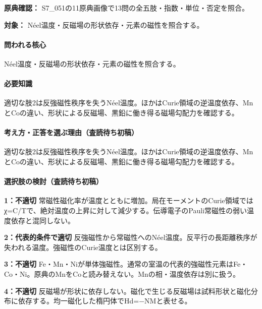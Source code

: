\noindent\textbf{原典確認：} S7\_051の11原典画像で13問の全五肢・指数・単位・否定を照合。\par

\noindent\textbf{対象：} Néel温度・反磁場の形状依存・元素の磁性を照合する。\par

\paragraph{問われる核心} Néel温度・反磁場の形状依存・元素の磁性を照合する。

\paragraph{必要知識} 適切な肢2は反強磁性秩序を失うNéel温度。ほかはCurie領域の逆温度依存、MnとCoの違い、形状による反磁場、黒鉛に働き得る磁場勾配力を確認する。

\paragraph{考え方・正答を選ぶ理由（査読待ち初稿）} 適切な肢2は反強磁性秩序を失うNéel温度。ほかはCurie領域の逆温度依存、MnとCoの違い、形状による反磁場、黒鉛に働き得る磁場勾配力を確認する。

\paragraph{選択肢の検討（査読待ち初稿）}\mbox{}\par

\noindent\textbf{1：不適切} 常磁性磁化率が温度とともに増加。局在モーメントのCurie領域ではχ=C/Tで、絶対温度の上昇に対して減少する。伝導電子のPauli常磁性の弱い温度依存と混同しない。\par

\noindent\textbf{2：代表的条件で適切} 反強磁性から常磁性へのNéel温度。反平行の長距離秩序が失われる温度。強磁性のCurie温度とは区別する。\par

\noindent\textbf{3：不適切} Fe・Mn・Niが単体強磁性。通常の室温の代表的強磁性元素はFe・Co・Ni。原典のMnをCoと読み替えない。Mnの相・温度依存は別に扱う。\par

\noindent\textbf{4：不適切} 反磁場が形状に依存しない。磁化で生じる反磁場は試料形状と磁化分布に依存する。均一磁化した楕円体でHd=−NMと表せる。\par

